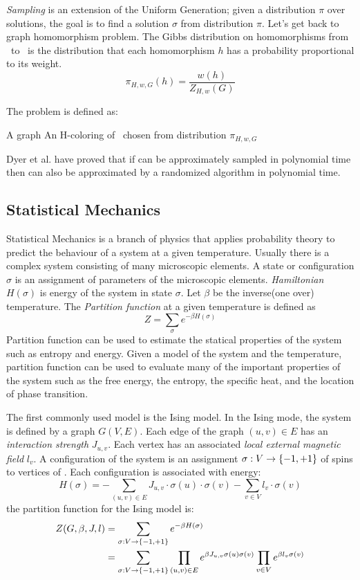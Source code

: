 \emph{Sampling} is an extension of the Uniform Generation; given a
distribution \(\pi\) over solutions, the goal is to find a solution \(\sigma \)
from distribution \(\pi\)\@.
Let's get back to graph homomorphism problem. 
The Gibbs distribution on homomorphisms from \mG\ to \mH\ is
the distribution that each homomorphism \(h\) has a probability proportional to its weight.
\[\pi_{H,w,G}(h)=\frac{w(h)}{Z_{H,w}(G)}\]

The  problem is defined as:

\pnndef%
{A graph \mG}
{An H-coloring of \mG\ chosen from distribution \(\pi_{H,w,G}\)}

Dyer et al. \cite{Sampling} have proved that if  can be approximately 
sampled in polynomial time then 
can also be approximated by a randomized algorithm in polynomial time.

\subsection*{Statistical Mechanics}
Statistical Mechanics is a branch of physics that applies probability theory to
predict the behaviour of a system at a given temperature. Usually there is a complex system
consisting of many microscopic elements. A state or configuration \(\sigma\) is an assignment of
parameters of the microscopic elements. 
\emph{Hamiltonian} \(H(\sigma)\) is energy of the system in state \(\sigma\)\@. 
Let \(\beta\) be the inverse(one over) temperature. 
The {\em Partition function} at a given temperature is defined as
\[Z=\sum_\sigma e^{-\beta H(\sigma)}\]
Partition function can be used to estimate the statical properties of the system such as entropy 
and energy. Given a model of the system and the temperature,
partition function can be used to evaluate many of the important properties of the system
such as the free energy, the entropy, the specific heat, and the location of phase transition. 

The first commonly used model is the Ising model. In the Ising mode,
the system is defined by a graph \(G(V,E)\)\@.
Each edge of the graph \((u,v)\in E\) has an {\em interaction strength} \(J_{u,v}\)\@. Each
vertex has an associated \emph{local external magnetic field} \(l_v\)\@.
A configuration of the system  is an assignment \(\sigma: V\to \{{-1,+1}\}\) of spins to
vertices of \mG. Each configuration is associated with energy:
\[H(\sigma)=-\sum_{(u,v)\in E}J_{u,v}\cdot\sigma(u)\cdot\sigma(v)-\sum_{v\in V} l_v\cdot\sigma(v)\]
the partition function for the Ising model is:
\begin{align*}
Z(G,\beta,J,l)&=\sum_{\sigma:V\to\{{-1,+1}\}}e^{-\beta H(\sigma)}\\
&=\sum_{\sigma:V\to\{{-1,+1}\}} \prod_{(u,v)\in E}
e^{\beta J_{u,v}\sigma(u)\sigma(v)} \prod_{v\in V} 
e^{\beta l_v\sigma(v)}
\end{align*}

